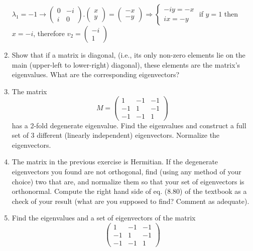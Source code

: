 \documentclass[fleqn]{article}
\begin{document}
\begin{enumerate}
       \textcolor{hwColor}{ 
        $
        \lambda_1=-1  \rightarrow 
        \begin{pmatrix}
         0 & -i \\
         i & 0  
        \end{pmatrix}.\begin{pmatrix}
          x \\
          y
        \end{pmatrix}=\begin{pmatrix}
          -x \\
          -y
        \end{pmatrix}
        \Longrightarrow 
        \begin{cases}
          -iy=-x \\
          ix=-y
        \end{cases}
        $
        if $y=1$ then $x=-i$, therefore $v_2=\begin{pmatrix}
          -i \\
          1
        \end{pmatrix}$
       }


    \item Show that if a matrix is diagonal, (i.e., its only non-zero elements lie on the main (upper-left to lower-right) diagonal), these elements are the matrix's eigenvalues. What are the corresponding eigenvectors?

    \item The matrix 
      $$M = 
      \begin{pmatrix}
      1 & -1 & -1 \\
      -1 & 1 & -1 \\
      -1 & -1 & 1
      \end{pmatrix}
      $$
      has a 2-fold degenerate eigenvalue. Find the eigenvalues and construct a full set of 3 different
      (linearly independent) eigenvectors. Normalize the eigenvectors.

    \item The matrix in the previous exercise is Hermitian. If the degenerate eigenvectors you found are not orthogonal, find (using any method of your choice) two that are, and normalize them so that your set of eigenvectors is orthonormal.
      Compute the right hand side of eq. (8.80) of the textbook as a check of your result (what are you supposed to find? Comment as adequate).

    \item Find the eigenvalues and a set of eigenvectors of the matrix
      $$ 
      \begin{pmatrix}
      1 & -1 & -1 \\
      -1 & 1 & -1 \\
      -1 & -1 & 1
      \end{pmatrix}
      $$


\end{enumerate}
\end{document}
